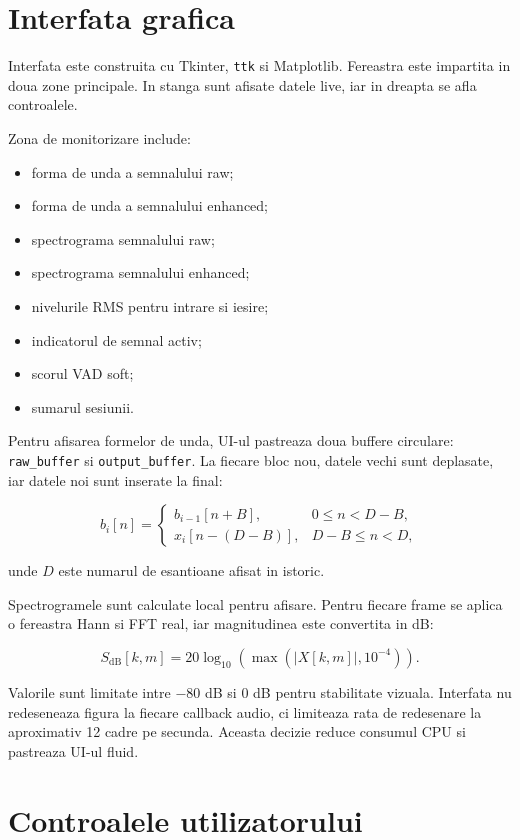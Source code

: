 \section{Interfata grafica}

Interfata este construita cu Tkinter, \texttt{ttk} si Matplotlib. Fereastra este
impartita in doua zone principale. In stanga sunt afisate datele live, iar in
dreapta se afla controalele.

Zona de monitorizare include:

\begin{itemize}
    \item forma de unda a semnalului raw;
    \item forma de unda a semnalului enhanced;
    \item spectrograma semnalului raw;
    \item spectrograma semnalului enhanced;
    \item nivelurile RMS pentru intrare si iesire;
    \item indicatorul de semnal activ;
    \item scorul VAD soft;
    \item sumarul sesiunii.
\end{itemize}

Pentru afisarea formelor de unda, UI-ul pastreaza doua buffere circulare:
\texttt{raw\_buffer} si \texttt{output\_buffer}. La fiecare bloc nou, datele
vechi sunt deplasate, iar datele noi sunt inserate la final:

\[
b_i[n] =
\begin{cases}
b_{i-1}[n+B], & 0 \leq n < D-B, \\
x_i[n-(D-B)], & D-B \leq n < D,
\end{cases}
\]

unde \(D\) este numarul de esantioane afisat in istoric.

Spectrogramele sunt calculate local pentru afisare. Pentru fiecare frame se
aplica o fereastra Hann si FFT real, iar magnitudinea este convertita in dB:

\[
S_{\text{dB}}[k,m] =
20 \log_{10}\left(\max(|X[k,m]|, 10^{-4})\right).
\]

Valorile sunt limitate intre \(-80\) dB si \(0\) dB pentru stabilitate vizuala.
Interfata nu redeseneaza figura la fiecare callback audio, ci limiteaza rata de
redesenare la aproximativ 12 cadre pe secunda. Aceasta decizie reduce consumul
CPU si pastreaza UI-ul fluid.

\section{Controalele utilizatorului}

